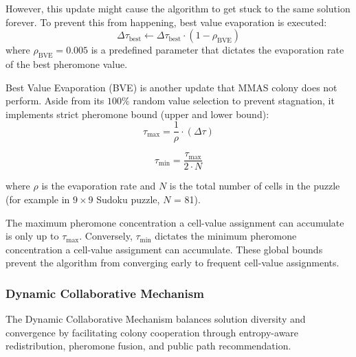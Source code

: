 However, this update might cause the algorithm to get stuck to the same solution forever. To prevent this from happening, best value evaporation is executed:
\begin{equation}
    \Delta\tau_{\text{best}} \leftarrow \Delta\tau_{\text{best}} \cdot (1 - \rho_{\text{BVE}})
\label{eq:best_evaporation}
\end{equation}
where $\rho_{\text{BVE}} = 0.005$ is a predefined parameter that dictates the evaporation rate of the best pheromone value. 


Best Value Evaporation (BVE) is another update that MMAS colony does not perform. Aside from its $100\%$ random value selection to prevent stagnation, it implements strict pheromone bound (upper and lower bound):
\begin{equation}
        \tau_{\max} = \frac{1}{\rho} \cdot \left( {\Delta \tau} \right)
        \label{eg:tau_max}
\end{equation}
	   


        \begin{equation}
        \tau_{\min} = \frac{\tau_{\max}}{2 \cdot N}
\label{eg:tau_min}
        \end{equation}


        where $\rho$ is the evaporation rate and $N$ is the total number of cells in the puzzle (for example in $9 \times 9$ Sudoku puzzle, $N$ = 81).

The maximum pheromone concentration a cell-value assignment can accumulate is only up to $\tau_{\max}$. Conversely, $\tau_{\min}$ dictates the minimum pheromone concentration a cell-value assignment can accumulate. These global bounds prevent the algorithm from converging early to frequent cell-value assignments. 

\subsubsection{Dynamic Collaborative Mechanism}
The Dynamic Collaborative Mechanism balances solution diversity and convergence by facilitating colony cooperation through entropy-aware redistribution, pheromone fusion, and public path recommendation. 

